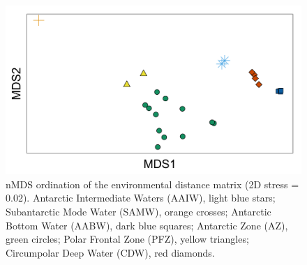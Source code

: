 \begin{figure}[!ht]
  \centering
  \includegraphics[width=\textwidth]{../advection/nMDSenvironmental.png}
  \caption[nMDS of advective distances between samples.]{nMDS ordination of the environmental distance matrix (2D stress = 0.02). Antarctic Intermediate Waters (AAIW), light blue stars; Subantarctic Mode Water (SAMW), orange crosses; Antarctic Bottom Water (AABW), dark blue squares; Antarctic Zone (AZ), green circles; Polar Frontal Zone (PFZ), yellow triangles; Circumpolar Deep Water (CDW), red diamonds.}
  \label{fig:nMDSenvironmental}
\end{figure}

